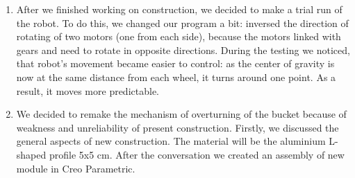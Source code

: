 \begin{enumerate}
\begin{enumerate}
	   \item After we finished working on construction, we decided to make a trial run of the robot. To do this, we changed our program a bit: inversed the direction of rotating of two motors (one from each side), because the motors linked with gears and need to rotate in opposite directions. During the testing we noticed, that robot's movement became easier to control: as the center of gravity is now at the same distance from each wheel, it turns around one point. As a result, it moves more predictable.
	   
	   \item We decided to remake the mechanism of overturning of the bucket because of weakness and unreliability of present construction. Firstly, we discussed the general aspects of new construction. The material will be the aluminium L-shaped profile 5x5 cm. After the conversation we created an assembly of new module in Creo Parametric.
	   \begin{figure}[H]
	   	\begin{minipage}[h]{0.2\linewidth}
	   		\center  
	   	\end{minipage}
	   	\begin{minipage}[h]{0.6\linewidth}
	   		\caption{}
	   	\end{minipage}
	   \end{figure}

	\end{enumerate}
	

\end{enumerate}
